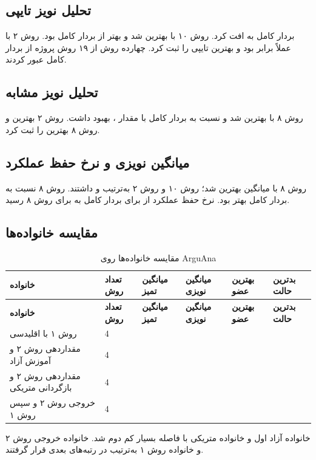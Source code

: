 \documentclass[a4paper,12pt]{article}
\makeatletter
\newcommand{\MRR}{\lr{MRR@10}}
\newcommand{\Recall}{\lr{Recall@10}}
\makeatother
\begin{document}
\subsection{تحلیل نویز تایپی}
بردار کامل به  افت کرد. روش ۱۰ با  بهترین شد و  بهتر از بردار کامل بود. روش ۲ با  عملاً برابر بود و بهترین \MRR تایپی را ثبت کرد. چهارده روش از ۱۹ روش پروژه از بردار کامل عبور کردند.

\subsection{تحلیل نویز مشابه }
روش ۸ با  بهترین شد و نسبت به بردار کامل با مقدار ،  بهبود داشت. روش ۲ بهترین \MRR و روش ۸ بهترین \Recall را ثبت کرد.

\subsection{میانگین نویزی و نرخ حفظ عملکرد}
روش ۸ با میانگین  بهترین شد؛ روش ۱۰ و روش ۲ به‌ترتیب  و  داشتند. روش ۸ نسبت به بردار کامل  بهتر بود. نرخ حفظ عملکرد از  برای بردار کامل به  برای روش ۸ رسید.

\subsection{مقایسه خانواده‌ها}
\scriptsize
\begin{longtable}{|C{5cm}|C{2cm}|C{2.4cm}|C{2.4cm}|C{2.4cm}|C{2.4cm}|}
\caption{مقایسه خانواده‌ها روی ArguAna}\label{tab:arg-family}\\
\hline
\textbf{خانواده} & \textbf{تعداد روش} & \textbf{میانگین تمیز} & \textbf{میانگین نویزی} & \textbf{بهترین عضو} & \textbf{بدترین حالت} \\
\hline
\endfirsthead
\hline
\textbf{خانواده} & \textbf{تعداد روش} & \textbf{میانگین تمیز} & \textbf{میانگین نویزی} & \textbf{بهترین عضو} & \textbf{بدترین حالت} \\
\hline
\endhead
روش ۱ با  اقلیدسی & 4 &  &  &  &  \\
\hline
مقداردهی روش ۲ و آموزش آزاد & 4 &  &  &  &  \\
\hline
مقداردهی روش ۲ و بازگردانی متریکی & 4 &  &  &  &  \\
\hline
{} خروجی روش ۲ و سپس روش ۱ & 4 &  &  &  &  \\
\hline
\end{longtable}
خانواده آزاد اول و خانواده متریکی با فاصله بسیار کم دوم شد. خانواده  خروجی روش ۲ و خانواده روش ۱ به‌ترتیب در رتبه‌های بعدی قرار گرفتند.
\end{document}
